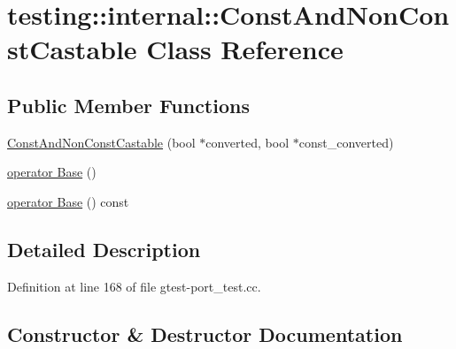 \hypertarget{classtesting_1_1internal_1_1_const_and_non_const_castable}{}\section{testing\+:\+:internal\+:\+:Const\+And\+Non\+Const\+Castable Class Reference}
\label{classtesting_1_1internal_1_1_const_and_non_const_castable}
\subsection*{Public Member Functions}
\begin{DoxyCompactItemize}
\item 
\hyperlink{classtesting_1_1internal_1_1_const_and_non_const_castable_aebe0ef6897b7f805e227bb969d4ee034}{Const\+And\+Non\+Const\+Castable} (bool $\ast$converted, bool $\ast$const\+\_\+converted)
\item 
\hyperlink{classtesting_1_1internal_1_1_const_and_non_const_castable_aff0c372d429d76d002bb29f83f2429fa}{operator Base} ()
\item 
\hyperlink{classtesting_1_1internal_1_1_const_and_non_const_castable_accd7e89982de250ed6c1b3ad1a5813df}{operator Base} () const 
\end{DoxyCompactItemize}


\subsection{Detailed Description}


Definition at line 168 of file gtest-\/port\+\_\+test.\+cc.



\subsection{Constructor \& Destructor Documentation}
